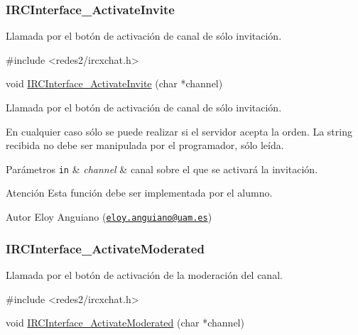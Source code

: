  \hypertarget{IRCInterface_ActivateInvite}{}\subsubsection{I\+R\+C\+Interface\+\_\+\+Activate\+Invite}\label{IRCInterface_ActivateInvite}
Llamada por el botón de activación de canal de sólo invitación.


\begin{DoxyCode}
\textcolor{preprocessor}{#include <redes2/ircxchat.h>}

\textcolor{keywordtype}{void} \hyperlink{G-2313-06-P2__client_8c_ac72762ab1e3575b421b967241db23f9c}{IRCInterface\_ActivateInvite} (\textcolor{keywordtype}{char} *channel)
\end{DoxyCode}


Llamada por el botón de activación de canal de sólo invitación.

En cualquier caso sólo se puede realizar si el servidor acepta la orden. La string recibida no debe ser manipulada por el programador, sólo leída.


\begin{DoxyParams}[1]{Parámetros}
\mbox{\tt in}  & {\em channel} & canal sobre el que se activará la invitación.\\
\hline
\end{DoxyParams}
\begin{DoxyWarning}{Atención}
Esta función debe ser implementada por el alumno.
\end{DoxyWarning}
\begin{DoxyAuthor}{Autor}
Eloy Anguiano (\href{mailto:eloy.anguiano@uam.es}{\tt eloy.\+anguiano@uam.\+es})
\end{DoxyAuthor}


 \hypertarget{IRCInterface_ActivateModerated}{}\subsubsection{I\+R\+C\+Interface\+\_\+\+Activate\+Moderated}\label{IRCInterface_ActivateModerated}
Llamada por el botón de activación de la moderación del canal.


\begin{DoxyCode}
\textcolor{preprocessor}{#include <redes2/ircxchat.h>}

\textcolor{keywordtype}{void} \hyperlink{G-2313-06-P2__client_8c_af83498f4058311f4562c43a9b70566b2}{IRCInterface\_ActivateModerated} (\textcolor{keywordtype}{char} *channel)
\end{DoxyCode}


